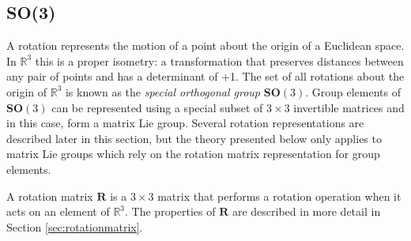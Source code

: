 		\begin{comment}	
		\textbf{Adjoint map}\\		
		EXPLANATION???\\
		For $A \in \mathbf{G}$ and $B \in ?$ define a function $\Psi$, known as the adjoint map of $\mathbf{G}$:
		\begin{equation}
			\Psi_A: \mathbf{G} \rightarrow \mathbf{G} \textnormal{, }
			\Psi_A(B) \stackrel{\Delta}{=} ABA^{-1}
		\end{equation}
		Taking the derivative:
		\begin{equation}
			\frac{\partial}{\partial t} \Psi_A(B(t))|_{t=0} = AVA^{-1} \textnormal{, }
			V \stackrel{\Delta}{=} 	\frac{\partial}{\partial t}B(t)|_{t=0}
		\end{equation}
		The adjoint	representation of $\mathbf{G}$ is given by the mapping
		\begin{equation}
			\textbf{Adj}_A: \mathfrak{g} \rightarrow \mathfrak{g} \textnormal{, }
			\textbf{Adj}_A(V) \stackrel{\Delta}{=} AVA^{-1}
		\end{equation}
		\end{comment}
		
	\subsection{\textbf{SO}(3)}	
		A rotation represents the motion of a point about the origin of a Euclidean space. In $\mathbb{R}^3$ this is a proper isometry: a transformation that preserves distances between any pair of points and has a determinant of +1. The set of all rotations about the origin of $\mathbb{R}^3$ is known as the \textit{special orthogonal group} $\textbf{SO}(3)$.
		Group elements of $\textbf{SO}(3)$ can be represented using a special subset of $3 \times 3$ invertible matrices and in this case, form a matrix Lie group. Several rotation representations are described later in this section, but the theory presented below only applies to matrix Lie groups which rely on the rotation matrix representation for group elements.
		
		A rotation matrix $\mathbf{R}$ is a $3 \times 3$ matrix that performs a rotation operation when it acts on an element of $\mathbb{R}^3$. The properties of $\mathbf{R}$ are described in more detail in Section \ref{sec:rotationmatrix}.
		
